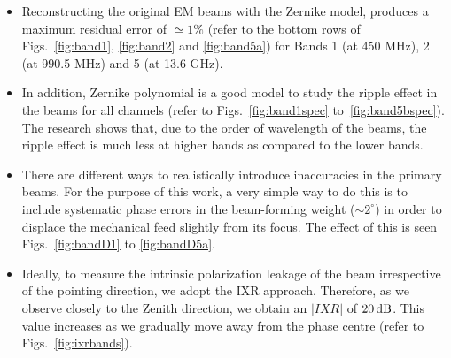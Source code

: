 \begin{itemize}
  \item Reconstructing the original EM beams with the Zernike model, produces a maximum residual error of 
  $\simeq 1 \%$ (refer to the bottom rows of Figs.~\ref{fig:band1}, \ref{fig:band2} and \ref{fig:band5a}) for Bands 1 (at 450 MHz),  2 (at 990.5 MHz) and 5 (at 13.6 GHz).
  \item In addition, Zernike polynomial is a good model to study the ripple effect in the beams for all channels (refer to Figs.~\ref{fig:band1spec} to~\ref{fig:band5bspec}).   The research shows that, due to the order of wavelength of the beams, the ripple effect is much less at higher bands as compared to the lower bands. 
\item  There are different ways to realistically introduce inaccuracies in the primary beams. For the purpose of this work, a very simple way to do this is to include systematic phase errors in the beam-forming weight ($\sim 2^{\circ}$) in order to displace the mechanical feed slightly from its focus. The effect of this is seen 
Figs.~\ref{fig:bandD1} to \ref{fig:bandD5a}.

\item Ideally, to measure the intrinsic polarization leakage of the beam irrespective of the pointing direction, we adopt the IXR approach. Therefore, as we observe closely to the Zenith direction, we obtain an $\lvert IXR \rvert$ of $20\, \rm dB$. This value increases as we gradually move away from the phase centre (refer to Figs.~\ref{fig:ixrbands}).


\end{itemize}
